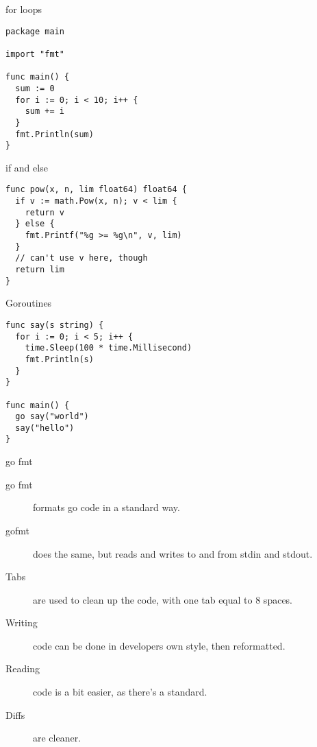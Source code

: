 \begin{frame}[fragile]{for loops}
  \begin{verbatim}
package main

import "fmt"

func main() {
  sum := 0
  for i := 0; i < 10; i++ {
    sum += i
  }
  fmt.Println(sum)
}
  \end{verbatim}
\end{frame}


\begin{frame}[fragile]{if and else}
  \begin{verbatim}
func pow(x, n, lim float64) float64 {
  if v := math.Pow(x, n); v < lim {
    return v
  } else {
    fmt.Printf("%g >= %g\n", v, lim)
  }
  // can't use v here, though
  return lim
}
  \end{verbatim}
\end{frame}

\begin{frame}[fragile]{Goroutines}
  \begin{verbatim}
func say(s string) {
  for i := 0; i < 5; i++ {
    time.Sleep(100 * time.Millisecond)
    fmt.Println(s)
  }
}

func main() {
  go say("world")
  say("hello")
}
  \end{verbatim}
\end{frame}

\begin{frame}{go fmt}
  \begin{description}
    \item[go fmt] formats go code in a standard way.
    \item[gofmt] does the same, but reads and writes to and from stdin and stdout.
    \item[Tabs] are used to clean up the code, with one tab equal to 8 spaces.
    \item[Writing] code can be done in developers own style, then reformatted.
    \item[Reading] code is a bit easier, as there's a standard.
    \item[Diffs] are cleaner.
  \end{description}
  
\end{frame}